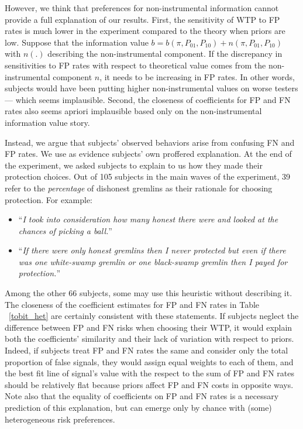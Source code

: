 \documentclass[12pt,a4paper]{article}
\begin{document}
However, we think that preferences for non-instrumental information cannot provide a full explanation of our results.  First, the sensitivity of WTP to FP rates is much lower in the experiment compared to the theory when priors are low. Suppose that the information value $b = b(\pi,P_{01},P_{10})+n(\pi,P_{01},P_{10})$ with $n(.)$ describing the non-instrumental component. If the discrepancy in sensitivities to FP rates with respect to theoretical value comes from the non-instrumental component $n$, it needs to be increasing in FP rates. In other words, subjects would have been putting higher non-instrumental values on worse testers --- which seems implausible. Second, the closeness of coefficients for FP and FN rates also seems apriori implausible based only on the non-instrumental information value story.

Instead, we argue that subjects' observed behaviors arise from confusing FN and FP rates. We use as evidence subjects' own proffered explanation.  At the end of the experiment, we asked subjects to explain to us how they made their protection choices.  Out of 105 subjects in the main waves of the experiment, 39 refer to the \textit{percentage} \normalfont  of dishonest gremlins as their rationale for choosing protection. For example:
\begin{itemize}
	\item ``\emph{I took into consideration how many honest there were and looked at the chances of picking a ball.}''
	\item ``\emph{If there were only honest gremlins then I never protected but even if there was one white-swamp gremlin or one black-swamp gremlin then I payed for protection.}''
\end{itemize}

Among the other 66 subjects, some may use this heuristic without describing it.  The closeness of the coefficient estimates for FP and FN rates in Table ~\ref{tobit_het} are certainly consistent with these statements. If subjects neglect the difference between FP and FN risks when choosing their WTP, it would explain both the coefficients' similarity and their lack of variation with respect to priors. Indeed, if subjects treat FP and FN rates the same and consider only the total proportion of false signals, they would assign equal weights to each of them, and the best fit line of signal's value with the respect to the sum of FP and FN rates should be relatively flat because priors affect FP and FN costs in opposite ways. Note also that the equality of coefficients on FP and FN rates is a necessary prediction of this explanation, but can emerge only by chance with (some) heterogeneous risk preferences.
\end{document}
